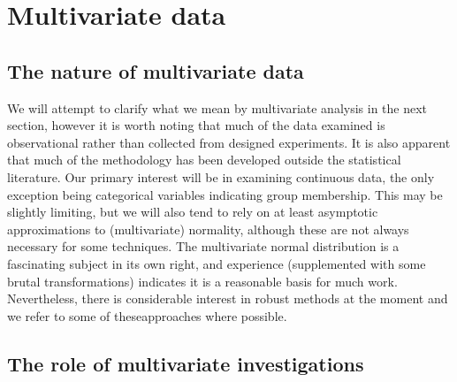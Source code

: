 \chapter{Multivariate data}
\label{outline}

\section{The nature of multivariate data}
\label{overview}

We will attempt to clarify what we mean by multivariate analysis in the next section, however it is worth noting that much of the data examined is observational rather than collected from designed experiments.   It is also apparent that much of the methodology has been developed outside the statistical literature.   Our primary interest will be in examining continuous data, the only exception being categorical variables indicating group membership.   This may be slightly limiting, but we will also tend to rely on at least asymptotic approximations to (multivariate) normality, although these are not always necessary for some techniques.   The multivariate normal distribution is a fascinating subject in its own right, and experience (supplemented with some brutal transformations) indicates it is a reasonable basis for much work.   Nevertheless, there is considerable interest in robust methods at the moment and we refer to some of theseapproaches where possible.

\section{The role of multivariate investigations}
\label{role}

